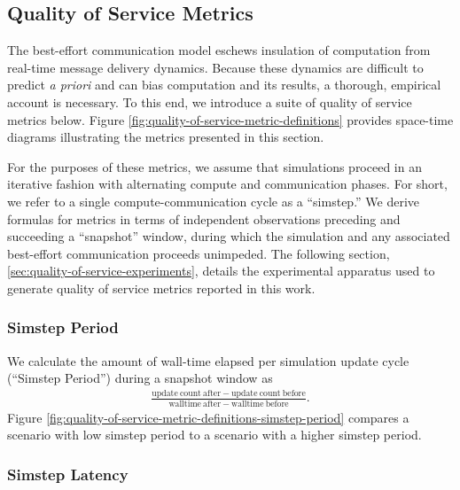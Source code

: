 \subsection{Quality of Service Metrics} \label{sec:quality-of-service-metrics}



The best-effort communication model eschews insulation of computation from  real-time message delivery dynamics.
Because these dynamics are difficult to predict \textit{a priori} and can bias computation and its results, a thorough, empirical account is necessary.
To this end, we introduce a suite of quality of service metrics below.
Figure \ref{fig:quality-of-service-metric-definitions} provides space-time diagrams illustrating the metrics presented in this section.

For the purposes of these metrics, we assume that simulations proceed in an iterative fashion with alternating compute and communication phases.
For short, we refer to a single compute-communication cycle as a ``simstep.''
We derive formulas for metrics in terms of independent observations preceding and succeeding a ``snapshot'' window, during which the simulation and any associated best-effort communication proceeds unimpeded.
The following section, \ref{sec:quality-of-service-experiments}, details the experimental apparatus used to generate quality of service metrics reported in this work.

\subsubsection{Simstep Period} \label{sec:simstep-period-metric}

We calculate the amount of wall-time elapsed per simulation update cycle (``Simstep Period'') during a snapshot window as
\begin{align*}
\frac{
  \mathrm{update\ count\ after} - \mathrm{update\ count\ before}
}{
  \mathrm{walltime\ after} - \mathrm{walltime\ before}
}.
\end{align*}
Figure \ref{fig:quality-of-service-metric-definitions-simstep-period} compares a scenario with low simstep period to a scenario with a higher simstep period.

\subsubsection{Simstep Latency} \label{sec:wall-time-latency-metric}


